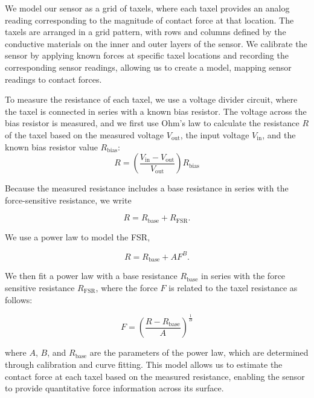 We model our sensor as a grid of taxels, where each taxel provides an analog reading corresponding to the magnitude of contact force at that location. The taxels are arranged in a grid pattern, with rows and columns defined by the conductive materials on the inner and outer layers of the sensor. We calibrate the sensor by applying known forces at specific taxel locations and recording the corresponding sensor readings, allowing us to create a model, mapping sensor readings to contact forces. 

To measure the resistance of each taxel, we use a voltage divider circuit, where the taxel is connected in series with a known bias resistor. The voltage across the bias resistor is measured, and we first use Ohm's law to calculate the resistance $R$ of the taxel based on the measured voltage $V_\text{out}$, the input voltage $V_\text{in}$, and the known bias resistor value $R_\text{bias}$:
\begin{equation}
R = \left( \frac{V_\text{in}-V_\text{out}}{V_\text{out}} \right) R_\text{bias} 
\end{equation}


Because the measured resistance includes a base resistance in series with the force-sensitive resistance, we write

\begin{equation}
R = R_\text{base} + R_\text{FSR}.
\end{equation}

We use a power law to model the FSR,

\begin{equation}
R = R_\text{base} + A F^{B}.
\end{equation}






We then fit a power law with a base resistance $R_\text{base}$ in series with the force sensitive resistance $R_\text{FSR}$, where the force $F$ is related to the taxel resistance as follows:

\begin{equation}
F=\left(\frac{R-R_\text{base}}{A}\right)^{\frac{1}{B}}
\end{equation}

where $A$, $B$, and $R_\text{base}$ are the parameters of the power law, which are determined through calibration and curve fitting. This model allows us to estimate the contact force at each taxel based on the measured resistance, enabling the sensor to provide quantitative force information across its surface.


